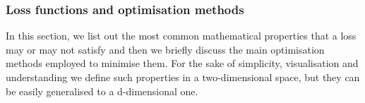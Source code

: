 \documentclass[sn-mathphys-num]{sn-jnl}%
\begin{document}
\subsubsection{Loss functions and optimisation methods}
  In this section, we list out the most common mathematical properties that a loss may or may not satisfy and then we briefly discuss the main optimisation methods employed to minimise them. For the sake of simplicity, visualisation and understanding we define such properties in a two-dimensional space, but they can be easily generalised to a d-dimensional one.
 
\end{document}
